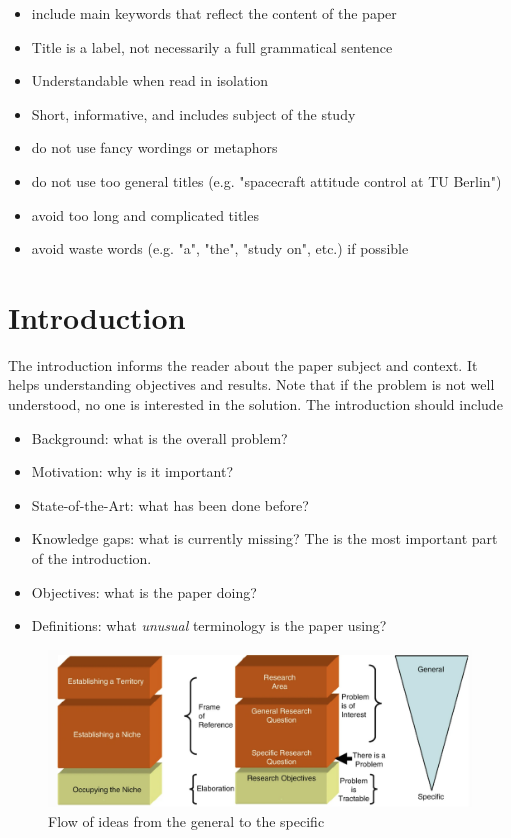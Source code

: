 \documentclass[
    twocolumn,
    fontsize = 10pt,
    parskip = half+,
    headings = small,
    headwidth = text,
    footwidth = text,
]{scrartcl}
\begin{document}
\begin{itemize}
    \item include main keywords that reflect the content of the paper
    \item Title is a label, not necessarily a full grammatical sentence
    \item Understandable when read in isolation
    \item Short, informative, and includes subject of the study
    \item do not use fancy wordings or metaphors
    \item do not use too general titles (e.g. "spacecraft attitude control at TU Berlin")
    \item avoid too long and complicated titles
    \item avoid waste words (e.g. "a", "the", "study on", etc.) if possible
\end{itemize}

\section{Introduction}
The introduction informs the reader about the paper subject and context.
It helps understanding objectives and results. 
Note that if the problem is not well  understood, no one is interested in the solution. 
The introduction should include
\begin{itemize}
    \item Background: what is the overall problem?
    \item Motivation: why is it important?
    \item State-of-the-Art: what has been done before?
    \item Knowledge gaps: what is currently missing?
    The is the most important part of the introduction.
    \item Objectives: what is the paper doing?
    \item Definitions: what \textsl{unusual} terminology is the paper using?
\end{itemize}

\begin{figure}[h]
    \centering
    \includegraphics[width=1.0\linewidth]{pics/research_question.PNG}
    \caption{Flow of ideas from the general to the specific~\cite{Nundy.2022}}
    \label{fig: research question}
\end{figure}
\end{document}
